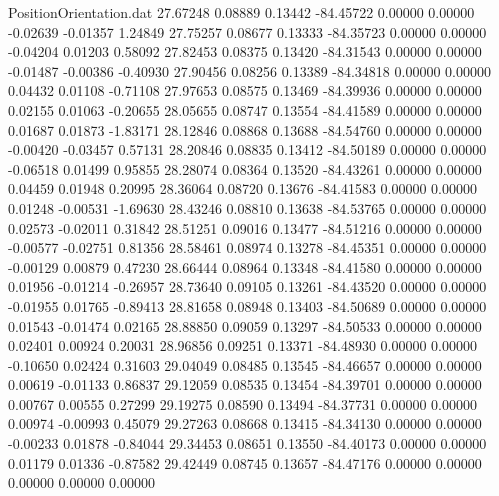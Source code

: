 \begin{filecontents}{PositionOrientation.dat}
  27.67248    0.08889    0.13442   -84.45722    0.00000    0.00000   -0.02639   -0.01357    1.24849
  27.75257    0.08677    0.13333   -84.35723    0.00000    0.00000   -0.04204    0.01203    0.58092
  27.82453    0.08375    0.13420   -84.31543    0.00000    0.00000   -0.01487   -0.00386   -0.40930
  27.90456    0.08256    0.13389   -84.34818    0.00000    0.00000    0.04432    0.01108   -0.71108
  27.97653    0.08575    0.13469   -84.39936    0.00000    0.00000    0.02155    0.01063   -0.20655
  28.05655    0.08747    0.13554   -84.41589    0.00000    0.00000    0.01687    0.01873   -1.83171
  28.12846    0.08868    0.13688   -84.54760    0.00000    0.00000   -0.00420   -0.03457    0.57131
  28.20846    0.08835    0.13412   -84.50189    0.00000    0.00000   -0.06518    0.01499    0.95855
  28.28074    0.08364    0.13520   -84.43261    0.00000    0.00000    0.04459    0.01948    0.20995
  28.36064    0.08720    0.13676   -84.41583    0.00000    0.00000    0.01248   -0.00531   -1.69630
  28.43246    0.08810    0.13638   -84.53765    0.00000    0.00000    0.02573   -0.02011    0.31842
  28.51251    0.09016    0.13477   -84.51216    0.00000    0.00000   -0.00577   -0.02751    0.81356
  28.58461    0.08974    0.13278   -84.45351    0.00000    0.00000   -0.00129    0.00879    0.47230
  28.66444    0.08964    0.13348   -84.41580    0.00000    0.00000    0.01956   -0.01214   -0.26957
  28.73640    0.09105    0.13261   -84.43520    0.00000    0.00000   -0.01955    0.01765   -0.89413
  28.81658    0.08948    0.13403   -84.50689    0.00000    0.00000    0.01543   -0.01474    0.02165
  28.88850    0.09059    0.13297   -84.50533    0.00000    0.00000    0.02401    0.00924    0.20031
  28.96856    0.09251    0.13371   -84.48930    0.00000    0.00000   -0.10650    0.02424    0.31603
  29.04049    0.08485    0.13545   -84.46657    0.00000    0.00000    0.00619   -0.01133    0.86837
  29.12059    0.08535    0.13454   -84.39701    0.00000    0.00000    0.00767    0.00555    0.27299
  29.19275    0.08590    0.13494   -84.37731    0.00000    0.00000    0.00974   -0.00993    0.45079
  29.27263    0.08668    0.13415   -84.34130    0.00000    0.00000   -0.00233    0.01878   -0.84044
  29.34453    0.08651    0.13550   -84.40173    0.00000    0.00000    0.01179    0.01336   -0.87582
  29.42449    0.08745    0.13657   -84.47176    0.00000    0.00000    0.00000    0.00000    0.00000
\end{filecontents}
